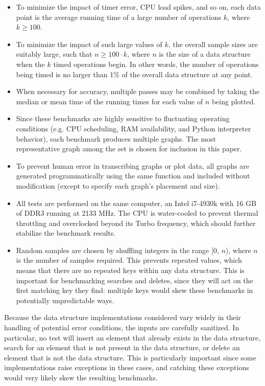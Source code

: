 \documentclass{article}
\begin{document}
\begin{itemize}
    \item To minimize the impact of timer error, CPU load spikes, and so on, each data point is the average running time of a large number of operations $k$, where $k \geq 100$.
    \item To minimize the impact of such large values of $k$, the overall sample sizes are suitably large, such that $n \geq 100 \cdot k$, where $n$ is the size of a data structure when the $k$ timed operations begin. In other words, the number of operations being timed is no larger than 1\% of the overall data structure at any point.
    \item When necessary for accuracy, multiple passes may be combined by taking the median or mean time of the running times for each value of $n$ being plotted.
    \item Since these benchmarks are highly sensitive to fluctuating operating conditions (e.g. CPU scheduling, RAM availability, and Python interpreter behavior), each benchmark produces multiple graphs. The most representative graph among the set is chosen for inclusion in this paper.
    \item To prevent human error in transcribing graphs or plot data, all graphs are generated programmatically using the same function and included without modification (except to specify each graph's placement and size).
    \item All tests are performed on the same computer, an Intel i7-4930k with 16 GB of DDR3 running at 2133 MHz. The CPU is water-cooled to prevent thermal throttling and overclocked beyond its Turbo frequency, which should further stabilize the benchmark results.
    \item Random samples are chosen by shuffling integers in the range [0, $n$), where $n$ is the number of samples required. This prevents repeated values, which means that there are no repeated keys within any data structure. This is important for benchmarking searches and deletes, since they will act on the first matching key they find: multiple keys would skew these benchmarks in potentially unpredictable ways.
\end{itemize}

Because the data structure implementations considered vary widely in their handling of potential error conditions, the inputs are carefully sanitized. In particular, no test will insert an element that already exists in the data structure, search for an element that is not present in the data structure, or delete an element that is not the data structure. This is particularly important since some implementations raise exceptions in these cases, and catching these exceptions would very likely skew the resulting benchmarks.
\end{document}
